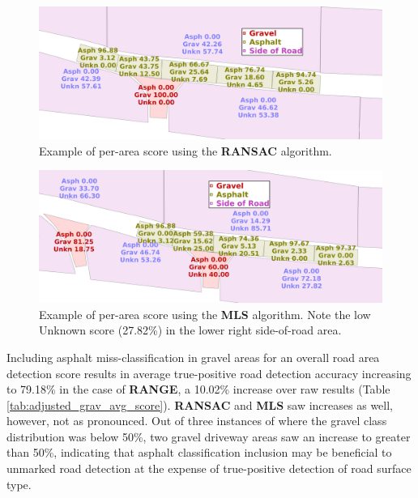 \documentclass[numbered,pdftex]{ohio-etd}
\begin{document}
{{		\begin{figure}[H]
			\centering
			\includegraphics[width=0.95\linewidth]{Defense_Images/ransac_actual_db_4_area_score}
			\caption[Area Scores: RANSAC]{Example of per-area score using the \textbf{RANSAC} algorithm.}
			\label{fig:ransac_example_area_score}
		\end{figure}
	
		\begin{figure}[H]
			\centering
			\includegraphics[width=0.95\linewidth]{Defense_Images/mls_db_4_area_scores}
			\caption[Area Scores: MLS]{Example of per-area score using the \textbf{MLS} algorithm. Note the low Unknown score (27.82\%) in the lower right side-of-road area.}
			\label{fig:mls_example_area_score}
		\end{figure}
	
		{Including asphalt miss-classification in gravel areas for an overall road area detection score results in average true-positive road detection accuracy increasing to 79.18\% in the case of \textbf{RANGE}, a 10.02\% increase over raw results (Table \ref{tab:adjusted_grav_avg_score}). \textbf{RANSAC} and \textbf{MLS} saw increases as well, however, not as pronounced. Out of three instances of where the gravel class distribution was below 50\%, two gravel driveway areas saw an increase to greater than 50\%, indicating that asphalt classification inclusion may be beneficial to unmarked road detection at the expense of true-positive detection of road surface type.}
	
}}
\end{document}
